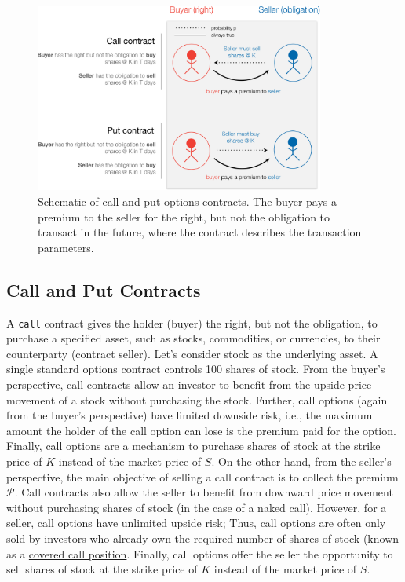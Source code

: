\documentclass[11pt]{article}
\theoremstyle{definition}
\begin{document}
\begin{figure}[ht]
    \centering
    \includegraphics[width=0.85\textwidth]{./figs/Fig-Options-Table-Schematic.pdf}
    \caption{Schematic of call and put options contracts. The buyer pays a premium to the seller for the right, but 
	not the obligation to transact in the future, where the contract describes the transaction parameters.}\label{fig:options-schematic}
\end{figure}

\subsection{Call and Put Contracts}
A \texttt{call} contract gives the holder (buyer) the right, but not the obligation, to purchase a specified asset, 
such as stocks, commodities, or currencies, to their counterparty (contract seller). 
Let's consider stock as the underlying asset. A single standard options contract controls 100 shares of stock. 
From the buyer's perspective, call contracts allow an investor to benefit from the upside price movement of a stock without purchasing the stock.
Further, call options (again from the buyer's perspective) have limited downside risk, i.e., the maximum amount the holder of the call option can lose 
is the premium paid for the option. Finally, call options are a mechanism to purchase shares of stock at the strike price of $K$ instead of the market price of $S$. 
On the other hand, from the seller's perspective, the main objective of selling a call contract is to collect the premium $\mathcal{P}$. 
Call contracts also allow the seller to benefit from downward price movement without purchasing shares of stock (in the case of a naked call).
However, for a seller, call options have unlimited upside risk; 
Thus, call options are often only sold by investors who already own the required number of shares of stock 
(known as a \href{https://www.investopedia.com/terms/c/coveredcall.asp}{covered call position}. 
Finally, call options offer the seller the opportunity to sell shares of stock at the strike price of $K$ instead of the market price of $S$.
\end{document}
